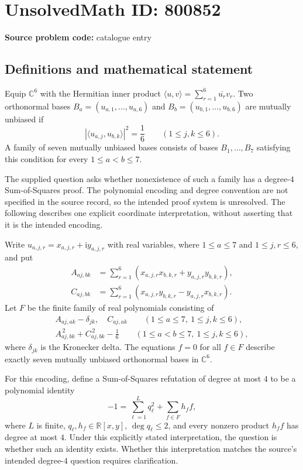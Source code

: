 \documentclass[11pt]{article}
\newcommand{\R}{\mathbb{R}}
\newcommand{\C}{\mathbb{C}}
\begin{document}
\section*{UnsolvedMath ID: 800852}
\textbf{Source problem code:} catalogue entry
\subsection{Definitions and mathematical statement}
Equip $\C^6$ with the Hermitian inner product $\langle u,v\rangle=\sum_{r=1}^6\overline{u_r}v_r$. Two orthonormal bases $B_a=(u_{a,1},\ldots,u_{a,6})$ and $B_b=(u_{b,1},\ldots,u_{b,6})$ are mutually unbiased if
\[
|\langle u_{a,j},u_{b,k}\rangle|^2=\frac16
\qquad(1\le j,k\le6).
\]
A family of seven mutually unbiased bases consists of bases $B_1,\ldots,B_7$ satisfying this condition for every $1\le a<b\le7$.

The supplied question asks whether nonexistence of such a family has a degree-$4$ Sum-of-Squares proof. The polynomial encoding and degree convention are not specified in the source record, so the intended proof system is unresolved. The following describes one explicit coordinate interpretation, without asserting that it is the intended encoding.

Write $u_{a,j,r}=x_{a,j,r}+\mathrm{i}y_{a,j,r}$ with real variables, where $1\le a\le7$ and $1\le j,r\le6$, and put
\[
\begin{aligned}
A_{aj,bk}&=\sum_{r=1}^6(x_{a,j,r}x_{b,k,r}+y_{a,j,r}y_{b,k,r}),\\
C_{aj,bk}&=\sum_{r=1}^6(x_{a,j,r}y_{b,k,r}-y_{a,j,r}x_{b,k,r}).
\end{aligned}
\]
Let $F$ be the finite family of real polynomials consisting of
\[
\begin{gathered}
A_{aj,ak}-\delta_{jk},\quad C_{aj,ak}
\qquad(1\le a\le7,\ 1\le j,k\le6),\\
A_{aj,bk}^{\,2}+C_{aj,bk}^{\,2}-\frac16
\qquad(1\le a<b\le7,\ 1\le j,k\le6),
\end{gathered}
\]
where $\delta_{jk}$ is the Kronecker delta. The equations $f=0$ for all $f\in F$ describe exactly seven mutually unbiased orthonormal bases in $\C^6$.

For this encoding, define a Sum-of-Squares refutation of degree at most $4$ to be a polynomial identity
\[
-1=\sum_{\ell=1}^{L}q_\ell^2+\sum_{f\in F}h_f f,
\]
where $L$ is finite, $q_\ell,h_f\in\R[x,y]$, $\deg q_\ell\le2$, and every nonzero product $h_f f$ has degree at most $4$. Under this explicitly stated interpretation, the question is whether such an identity exists. Whether this interpretation matches the source's intended degree-$4$ question requires clarification.
\end{document}
